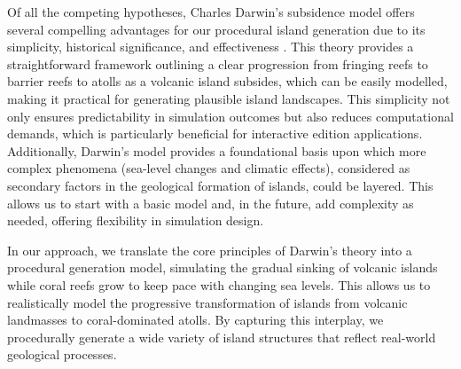 

Of all the competing hypotheses, Charles Darwin's subsidence model offers several compelling advantages for our procedural island generation due to its simplicity, historical significance, and effectiveness \cite{Tomascik1997}. This theory provides a straightforward framework outlining a clear progression from fringing reefs to barrier reefs to atolls as a volcanic island subsides, which can be easily modelled, making it practical for generating plausible island landscapes. This simplicity not only ensures predictability in simulation outcomes but also reduces computational demands, which is particularly beneficial for interactive edition applications. Additionally, Darwin's model provides a foundational basis upon which more complex phenomena (sea-level changes and climatic effects), considered as secondary factors in the geological formation of islands, could be layered. This allows us to start with a basic model and, in the future, add complexity as needed, offering flexibility in simulation design.

In our approach, we translate the core principles of Darwin's theory into a procedural generation model, simulating the gradual sinking of volcanic islands while coral reefs grow to keep pace with changing sea levels. This allows us to realistically model the progressive transformation of islands from volcanic landmasses to coral-dominated atolls. By capturing this interplay, we procedurally generate a wide variety of island structures that reflect real-world geological processes.

